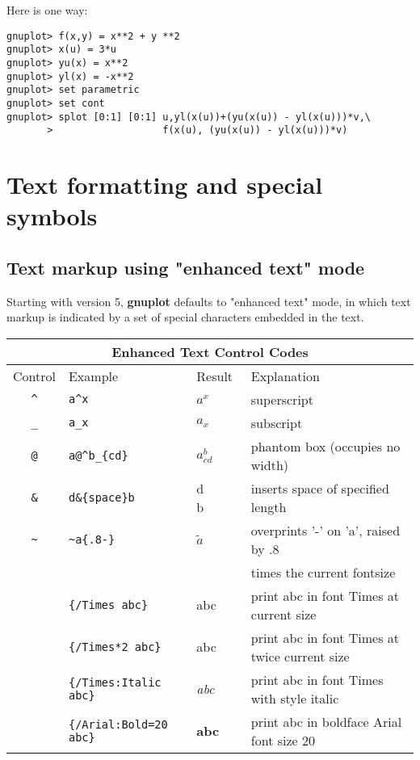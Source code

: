 \documentclass[letter,11pt]{article}
\newcommand{\gnuplot}{\textbf{gnuplot }}
\begin{document}
{Here is one way:
\small
\begin{verbatim}
gnuplot> f(x,y) = x**2 + y **2
gnuplot> x(u) = 3*u
gnuplot> yu(x) = x**2
gnuplot> yl(x) = -x**2
gnuplot> set parametric
gnuplot> set cont
gnuplot> splot [0:1] [0:1] u,yl(x(u))+(yu(x(u)) - yl(x(u)))*v,\
       >                   f(x(u), (yu(x(u)) - yl(x(u)))*v)
\end{verbatim}
\normalsize


\section{Text formatting and special symbols}

\subsection{Text markup using "enhanced text" mode}

Starting with version 5, \gnuplot defaults to "enhanced text" mode,
in which text markup is indicated by a set of special characters embedded in the text.

\begin{center}
\begin{tabular}{|clll|} \hline
\multicolumn{4}{|c|}{Enhanced Text Control Codes} \\ \hline
Control & Example & Result & Explanation \\ \hline
\verb~^~ & \verb~a^x~ & $a^x$ & superscript\\
\verb~_~ & \verb~a_x~ & $a_x$ & subscript\\
\verb~@~ & \verb~a@^b_{cd}~ & $a^b_{cd}$ &phantom box (occupies no width)\\
\verb~&~ & \verb~d&{space}b~ & d\verb*+     +b & inserts space of specified length\\
\verb|~| & \verb|~a{.8-}| & $\tilde{a}$ & overprints '-' on 'a', raised by .8\\
\verb~ ~ & \verb~ ~ & ~ ~ & times the current fontsize\\
\verb| | & \verb|{/Times abc}| & {\rm abc} & print abc in font Times at current size\\
\verb| | & \verb|{/Times*2 abc}| & \Large{\rm abc} & print abc in font Times at twice current size\\
\verb| | & \verb|{/Times:Italic abc}| & {\it abc} & print abc in font Times with style italic\\
\verb| | & \verb|{/Arial:Bold=20 abc}| & \Large\textsf{\textbf{abc}} & print abc in boldface Arial font size 20\\
\hline
\end{tabular}
\end{center}

}
\end{document}
